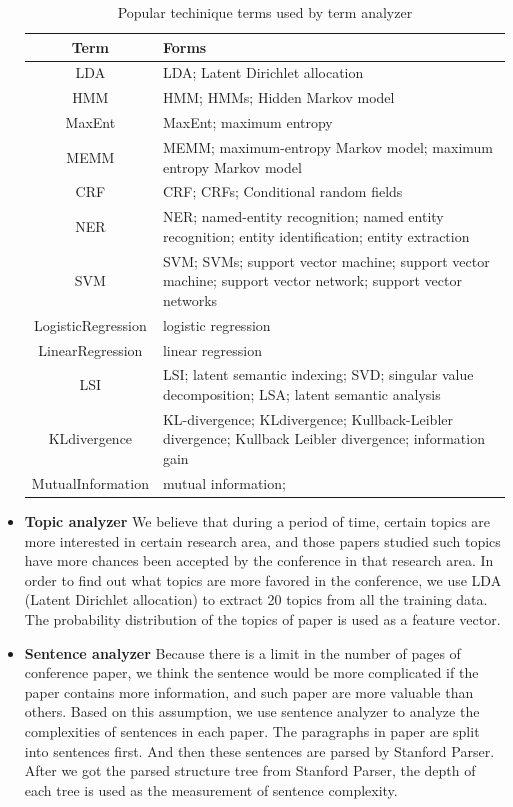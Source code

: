 \documentclass[11pt,letterpaper]{article}
\begin{document}
\begin{itemize}
\begin{table}
\begin{center}
\begin{tabular}{|c|p{4cm}|}
\hline 
Term & Forms\\ \hline 
LDA	& LDA; Latent Dirichlet allocation\\ \hline 
HMM	& HMM; HMMs; Hidden Markov model\\ \hline 
MaxEnt	&MaxEnt; maximum entropy\\ \hline 
MEMM &	MEMM; maximum-entropy Markov model; maximum entropy Markov model\\ \hline 
CRF	& CRF; CRFs; Conditional random fields\\ \hline 
NER	& NER; named-entity recognition; named entity recognition; entity identification; entity extraction\\ \hline 
SVM	& SVM; SVMs; support vector machine; support vector machine; support vector network; support vector networks\\ \hline 
LogisticRegression	& logistic regression \\ \hline 
LinearRegression	&linear regression\\ \hline 
LSI &	LSI; latent semantic indexing; SVD; singular value decomposition; LSA; latent semantic analysis\\ \hline 
KLdivergence &	KL-divergence; KLdivergence; Kullback-Leibler divergence; Kullback Leibler divergence; information gain\\ \hline 
MutualInformation&	mutual information;\\ \hline 
\end{tabular}
\end{center}
\caption{Popular techinique terms used by term analyzer}
\label{tab:terms}
\end{table}






\item	{\bf Topic analyzer}
We believe that during a period of time, certain topics are more interested in certain research area, and those papers studied such topics have more chances been accepted by the conference in that research area. In order to find out what topics are more favored in the conference, we use LDA (Latent Dirichlet allocation) to extract 20 topics from all the training data. The probability distribution of the topics of paper is used as a feature vector. 

\item	{\bf Sentence analyzer}
Because there is a limit in the number of pages of conference paper, we think the sentence would be more complicated if the paper contains more information, and such paper are more valuable than others. Based on this assumption, we use sentence analyzer to analyze the complexities of sentences in each paper. The paragraphs in paper are split into sentences first. And then these sentences are parsed by Stanford Parser. After we got the parsed structure tree from Stanford Parser, the depth of each tree is used as the measurement of sentence complexity. 

\end{itemize} 
\end{document}
